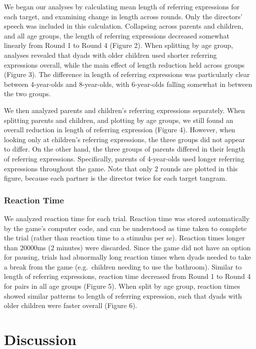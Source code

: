 \documentclass[10pt, letterpaper]{article}
\begin{document}
We began our analyses by calculating mean length of referring
expressions for each target, and examining change in length across
rounds. Only the directors' speech was included in this calculation.
Collapsing across parents and children, and all age groups, the length
of referring expressions decreased somewhat linearly from Round 1 to
Round 4 (Figure 2). When splitting by age group, analyses revealed that
dyads with older children used shorter referring expressions overall,
while the main effect of length reduction held across groups (Figure 3).
The difference in length of referring expressions was particularly clear
between 4-year-olds and 8-year-olds, with 6-year-olds falling somewhat
in between the two groups.

We then analyzed parents and children's referring expressions
separately. When splitting parents and children, and plotting by age
groups, we still found an overall reduction in length of referring
expression (Figure 4). However, when looking only at children's
referring expressions, the three groups did not appear to differ. On the
other hand, the three groups of parents differed in their length of
referring expressions. Specifically, parents of 4-year-olds used longer
referring expressions throughout the game. Note that only 2 rounds are
plotted in this figure, because each partner is the director twice for
each target tangram.

\hypertarget{reaction-time}{%
\subsubsection{Reaction Time}\label{reaction-time}}

We analyzed reaction time for each trial. Reaction time was stored
automatically by the game's computer code, and can be understood as time
taken to complete the trial (rather than reaction time to a stimulus per
se). Reaction times longer than 20000ms (2 minutes) were discarded.
Since the game did not have an option for pausing, trials had abnormally
long reaction times when dyads needed to take a break from the game
(e.g.~children needing to use the bathroom). Similar to length of
referring expressions, reaction time decreased from Round 1 to Round 4
for pairs in all age groups (Figure 5). When split by age group,
reaction times showed similar patterns to length of referring
expression, such that dyads with older children were faster overall
(Figure 6).

\hypertarget{discussion}{%
\section{Discussion}\label{discussion}}
\end{document}
